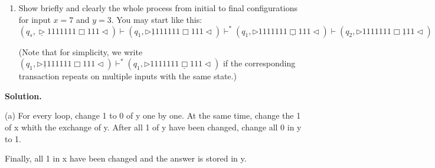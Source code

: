 \documentclass[12pt,a4paper]{article}
\theoremstyle{definition}
\begin{document}
\begin{enumerate}
\begin{enumerate}
	\item
	Show briefly and clearly the whole process from initial to final configurations for input $x = 7$ and $y = 3$. You may start like this:
	$$(q_s,\underline{\triangleright}  1  1  1  1  1  1  1  \Box 1  1  1   \triangleleft)
	\vdash (q_1,\triangleright  \underline{1}  1  1  1  1  1  1  \Box 1  1  1   \triangleleft)
	\vdash^* (q_1,\triangleright  1  1  1  1  1  1  1  \underline{\Box} 1  1  1   \triangleleft)
	\vdash (q_2,\triangleright  1  1  1  1  1  1  1  \Box \underline{1}  1  1   \triangleleft)$$
	
	\par{\color{blue}(Note that for simplicity, we write $(q_1,\triangleright  \underline{1}  1  1  1  1  1  1  \Box 1  1  1   \triangleleft)\vdash^* (q_1,\triangleright  1  1  1  1  1  1  1  \underline{\Box} 1  1  1   \triangleleft)$ if the corresponding transaction repeats on multiple inputs with the same state.)}
	
\end{enumerate}

\textbf{Solution.}

(a) For every loop, change 1 to 0 of y one by one. At the same time, change the 1 of x whith the exchange of y. After all 1 of y have been changed, change all 0 in y to 1.

Finally, all 1 in x have been changed and the answer is stored in y.


\end{enumerate}
\end{document}
